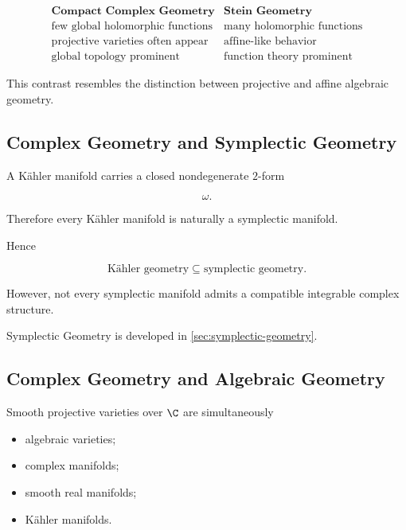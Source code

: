 \[
\boxed{
\begin{array}{c|c}
\textbf{Compact Complex Geometry}
&
\textbf{Stein Geometry}
\\
\hline
\text{few global holomorphic functions}
&
\text{many holomorphic functions}
\\
\text{projective varieties often appear}
&
\text{affine-like behavior}
\\
\text{global topology prominent}
&
\text{function theory prominent}
\end{array}
}
\]

This contrast resembles the distinction between projective and affine
algebraic geometry.

\subsection{Complex Geometry and Symplectic Geometry}
\label{subsec:complex-symplectic-connection}

A K\"ahler manifold carries a closed nondegenerate \(2\)-form

\[
\omega.
\]

Therefore every K\"ahler manifold is naturally a symplectic manifold.

Hence

\[
\boxed{
\text{K\"ahler geometry}
\subseteq
\text{symplectic geometry}.
}
\]

However, not every symplectic manifold admits a compatible integrable complex
structure.

Symplectic Geometry is developed in
\cref{sec:symplectic-geometry}.

\subsection{Complex Geometry and Algebraic Geometry}
\label{subsec:complex-algebraic-connection}

Smooth projective varieties over \(\C\) are simultaneously

\begin{itemize}
    \item algebraic varieties;
    \item complex manifolds;
    \item smooth real manifolds;
    \item K\"ahler manifolds.
\end{itemize}

